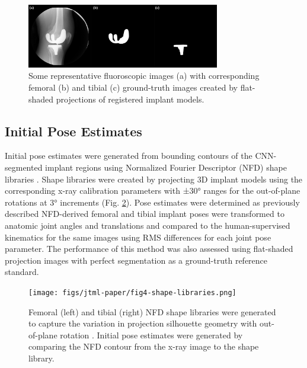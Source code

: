 {\begin{figure}[h]
	\centering
	\includegraphics[width = 0.75\textwidth]{figs/jtml-paper/fig3-seglabels.png}
	\caption[Representative fluoroscopic images]{Some representative fluoroscopic images (a) with corresponding femoral (b) and tibial (c) ground-truth images created by flat-shaded projections of registered implant models.}
	\label{fig:seg-labels}
\end{figure}

\subsection{Initial Pose Estimates}

Initial pose estimates were generated from bounding contours of the CNN-segmented implant regions using Normalized Fourier Descriptor (NFD) shape libraries \cite{banksAccurateMeasurementThreedimensional1996,wallaceAnalysisThreedimensionalMovement1980,wallaceEfficientThreedimensionalAircraft1980}. Shape libraries were created by projecting 3D implant models using the corresponding x-ray calibration parameters with ±30° ranges for the out-of-plane rotations at 3° increments (Fig. \ref{fig:nfd-lib}). Pose estimates were determined as previously described \cite{banksAccurateMeasurementThreedimensional1996} NFD-derived femoral and tibial implant poses were transformed to anatomic joint angles and translations \cite{groodJointCoordinateSystem1983} and compared to the human-supervised kinematics for the same images using RMS differences for each joint pose parameter. The performance of this method was also assessed using flat-shaded projection images with perfect segmentation as a ground-truth reference standard.


\begin{figure}[ht]
	\centering
	\texttt{[image: figs/jtml-paper/fig4-shape-libraries.png]}
	\caption[Femoral and tibial NFD shape libraries were generated to capture the variation in projection silhouette geometry with out-of-plane rotation]{Femoral (left) and tibial (right) NFD shape libraries were generated to capture the variation in projection silhouette geometry with out-of-plane rotation \cite{banksAccurateMeasurementThreedimensional1996}. Initial pose estimates were generated by comparing the NFD contour from the x-ray image to the shape library.}
	\label{fig:nfd-lib}
\end{figure}

}
